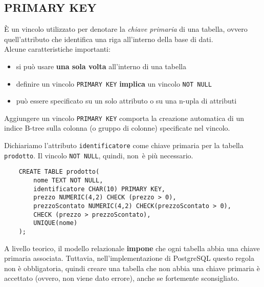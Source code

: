 \documentclass[12pt,a4paper]{book}
\begin{document}
	\subsection{PRIMARY KEY}
	È un vincolo utilizzato per denotare la \textit{chiave primaria} di una tabella, ovvero quell'attributo che identifica una riga all'interno della base di dati.\\
	Alcune caratteristiche importanti:	
	\begin{itemize}
		\item si può usare \textbf{una sola volta} all'interno di una tabella
		\item definire un vincolo \texttt{PRIMARY KEY} \textbf{implica} un vincolo \texttt{NOT NULL}
		\item può essere specificato su un solo attributo o su una n-upla di attributi
	\end{itemize}
	Aggiungere un vincolo \texttt{PRIMARY KEY} comporta la creazione automatica di un indice B-tree sulla colonna (o gruppo di colonne) specificate nel vincolo.
	\begin{tcolorbox}[enhanced jigsaw, breakable,title=Esempio, title filled]
	Dichiariamo l'attributo \texttt{identificatore} come chiave primaria per la tabella \texttt{prodotto}. Il vincolo \texttt{NOT NULL}, quindi, non è più necessario.
	\begin{lstlisting}
	CREATE TABLE prodotto(
		nome TEXT NOT NULL,
		identificatore CHAR(10) PRIMARY KEY,
		prezzo NUMERIC(4,2) CHECK (prezzo > 0),
		prezzoScontato NUMERIC(4,2) CHECK(prezzoScontato > 0),
		CHECK (prezzo > prezzoScontato),
		UNIQUE(nome)
	);
	\end{lstlisting}
	\end{tcolorbox}
	\begin{tcolorbox}[enhanced jigsaw, breakable, title=Attenzione, colframe=red!70!black]
	A livello teorico, il modello relazionale \textbf{impone} che ogni tabella abbia una chiave primaria associata. Tuttavia, nell'implementazione di PostgreSQL questo regola non è obbligatoria, quindi creare una tabella che non abbia una chiave primaria è accettato (ovvero, non viene dato errore), anche se fortemente sconsigliato.
	\end{tcolorbox}
\end{document}
